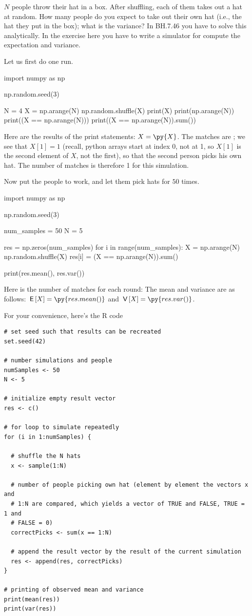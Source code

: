 \documentclass[lectures]{subfiles}
\begin{document}
\begin{exercise}
$N$ people throw their hat in a box. After shuffling, each of them takes out a hat at random. How many people do you expect to take out their own hat (i.e., the hat they put in the box); what is the variance? In BH.7.46 you have to solve this analytically. In the exercise here you have to write a simulator for compute the expectation and variance.
\begin{solution}
Let us first do one run.
\begin{pyblock}[][numbers=left,frame=lines]
import numpy as np

np.random.seed(3)

N = 4
X = np.arange(N)
np.random.shuffle(X)
print(X)
print(np.arange(N))
print((X == np.arange(N)))
print((X == np.arange(N)).sum())
\end{pyblock}
Here are the results of the print statements: $X = \py{X}$. The matches are ; we see that $X[1] = 1$ (recall, python arrays start at index 0, not at 1, so $X[1]$ is the second element of $X$, not the first), so that the second person picks his own hat. The number of matches is therefore 1 for this simulation.

Now put the people to work, and let them pick hats for $50$ times.
\begin{pyblock}[][numbers=left,frame=lines]
import numpy as np

np.random.seed(3)

num_samples = 50
N = 5

res = np.zeros(num_samples)
for i in range(num_samples):
    X = np.arange(N)
    np.random.shuffle(X)
    res[i] = (X == np.arange(N)).sum()

print(res.mean(), res.var())
\end{pyblock}
Here is the number of matches for each round: 
The mean and variance are as follows: $\E X = \py{res.mean()}$ and $\V X = \py{res.var()}$.

For your convenience, here's the R code
\begin{verbatim}
# set seed such that results can be recreated
set.seed(42)

# number simulations and people
numSamples <- 50
N <- 5

# initialize empty result vector
res <- c()

# for loop to simulate repeatedly
for (i in 1:numSamples) {

  # shuffle the N hats
  x <- sample(1:N)

  # number of people picking own hat (element by element the vectors x and
  # 1:N are compared, which yields a vector of TRUE and FALSE, TRUE = 1 and
  # FALSE = 0)
  correctPicks <- sum(x == 1:N)

  # append the result vector by the result of the current simulation
  res <- append(res, correctPicks)
}

# printing of observed mean and variance
print(mean(res))
print(var(res))
\end{verbatim}

\end{solution}
\end{exercise}
\end{document}
